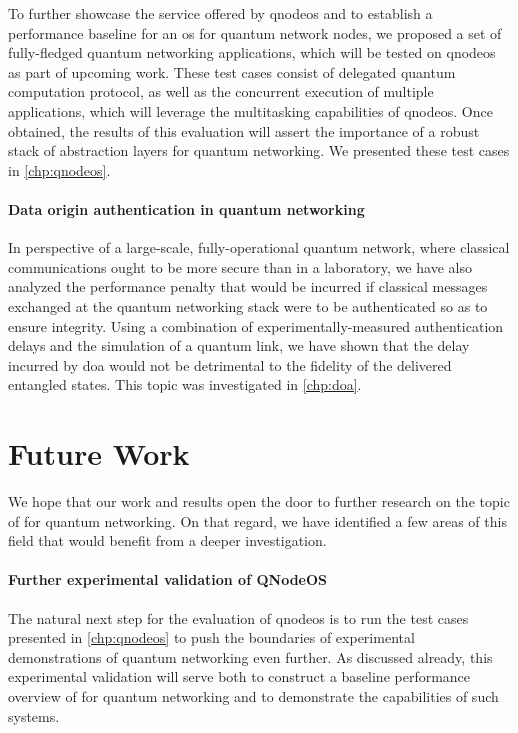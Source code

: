 To further showcase the service offered by \acrshort{qnodeos} and to establish a performance
baseline for an \acrshort{os} for quantum network nodes, we proposed a set of fully-fledged quantum
networking applications, which will be tested on \acrshort{qnodeos} as part of upcoming work. These
test cases consist of delegated quantum computation protocol, as well as the concurrent execution of
multiple applications, which will leverage the multitasking capabilities of \acrshort{qnodeos}. Once
obtained, the results of this evaluation will assert the importance of a robust stack of abstraction
layers for quantum networking. We presented these test cases in \cref{chp:qnodeos}.

\paragraph{Data origin authentication in quantum networking}

In perspective of a large-scale, fully-operational quantum network, where classical communications
ought to be more secure than in a laboratory, we have also analyzed the performance penalty that
would be incurred if classical messages exchanged at the quantum networking stack were to be
authenticated so as to ensure integrity. Using a combination of experimentally-measured
authentication delays and the simulation of a quantum link, we have shown that the delay incurred by
\acrlong{doa} would not be detrimental to the fidelity of the delivered entangled states. This topic
was investigated in \cref{chp:doa}.

\section{Future Work}

We hope that our work and results open the door to further research on the topic of 
for quantum networking. On that regard, we have identified a few areas of this field that would
benefit from a deeper investigation.

\paragraph{Further experimental validation of QNodeOS}

The natural next step for the evaluation of \acrshort{qnodeos} is to run the test cases presented in
\cref{chp:qnodeos} to push the boundaries of experimental demonstrations of quantum networking even
further. As discussed already, this experimental validation will serve both to construct a baseline
performance overview of  for quantum networking and to demonstrate the capabilities
of such systems.


